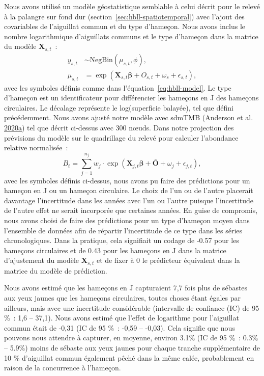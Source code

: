 \documentclass[11pt]{book}
\begin{document}
Nous avons utilisé un modèle géostatistique semblable à celui décrit pour le relevé à la palangre sur fond dur (section~\ref{sec:hbll-spatiotemporal}) avec l'ajout des covariables de l'aiguillat commun et du type d'hameçon. Nous avons inclus le nombre logarithmique d'aiguillats communs et le type d'hameçon dans la matrice du modèle \(\bm{X}_{s,t}\)~:
\begin{align}
  y_{s,t} &\sim \mathrm{NegBin}(\mu_{s,t}, \phi),\\
  \mu_{s,t} &= \exp \left( \bm{X}_{s,t} \bm{\beta} + O_{s,t} + \omega_s + \epsilon_{s,t} \right),
\label{eq:dogfish-model}
\end{align}
avec les symboles définis comme dans l'équation~\ref{eq:hbll-model}. Le type d'hameçon est un identificateur pour différencier les hameçons en J des hameçons circulaires. Le décalage représente le log(superficie balayée), tel que défini précédemment. Nous avons ajusté notre modèle avec sdmTMB (Anderson et al. \protect\hyperlink{ref-sdmtmb}{2020}\protect\hyperlink{ref-sdmtmb}{a}) tel que décrit ci-dessus avec 300 nœuds. Dans notre projection des prévisions du modèle sur le quadrillage du relevé pour calculer l'abondance relative normalisée~:
\begin{equation}
B_t = \sum_{j = 1}^{n_j}
  w_j \cdot \exp \left( \bm{X}_{j,t} \bm{\beta} + \bar{\bm{O}} + \omega_j + \epsilon_{j,t} \right),
\label{eq:dog-prediction}
\end{equation}
avec les symboles définis ci-dessus, nous avons pu faire des prédictions pour un hameçon en J ou un hameçon circulaire. Le choix de l'un ou de l'autre placerait davantage l'incertitude dans les années avec l'un ou l'autre puisque l'incertitude de l'autre effet ne serait incorporée que certaines années. En guise de compromis, nous avons choisi de faire des prédictions pour un type d'hameçon moyen dans l'ensemble de données afin de répartir l'incertitude de ce type dans les séries chronologiques. Dans la pratique, cela signifiait un codage de -0.57 pour les hameçons circulaires et de 0.43 pour les hameçons en J dans la matrice d'ajustement du modèle \(\bm{X}_{s,t}\) et de fixer à 0 le prédicteur équivalent dans la matrice du modèle de prédiction.

Nous avons estimé que les hameçons en J capturaient 7,7 fois plus de sébastes aux yeux jaunes que les hameçons circulaires, toutes choses étant égales par ailleurs, mais avec une incertitude considérable (intervalle de confiance (IC) de 95 \%~: 1,6 -- 37,1). Nous avons estimé que l'effet de logarithme pour l'aiguillat commun était de -0,31 (IC de 95 \%~: -0,59 -- -0,03). Cela signifie que nous pouvons nous attendre à capturer, en moyenne, environ 3.1\% (IC de 95 \%~: 0.3\% -- 5.9\%) moins de sébaste aux yeux jaunes pour chaque tranche supplémentaire de 10 \% d'aiguillat commun également pêché dans la même calée, probablement en raison de la concurrence à l'hameçon.
\end{document}
